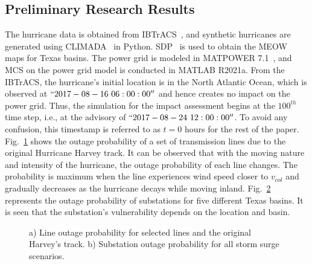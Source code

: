 \subsection{Preliminary Research Results}
The hurricane data is obtained from IBTrACS~\cite{Knapp2010}, and synthetic hurricanes are generated using CLIMADA~\cite{Climada} in Python. SDP~\cite{SDP} is used to obtain the MEOW maps for Texas basins. The power grid is modeled in MATPOWER 7.1~\cite{5491276}, and MCS on the power grid model is conducted in MATLAB R2021a.  
From the IBTrACS, the hurricane's initial location is in the North Atlantic Ocean, which is observed at $``2017-08-16~06:00:00''$ and hence creates no impact on the power grid. Thus, the simulation for the impact assessment begins at the $100^{th}$ time step, i.e., at the advisory of $``2017-08-24~12:00:00''$. To avoid any confusion, this timestamp is referred to as $t=0$ hours for the rest of the paper. Fig.~\ref{fig:line_outage_probability} shows the outage probability of a set of transmission lines due to the original Hurricane Harvey track. It can be observed that with the moving nature and intensity of the hurricane, the outage probability of each line changes. The probability is maximum when the line experiences wind speed closer to $v_{col}$ and gradually decreases as the hurricane decays while moving inland. Fig.~\ref{fig:substation_outage_probability} represents the outage probability of substations for five different Texas basins. It is seen that the substation's vulnerability depends on the location and basin.

\begin{figure}[!h!]
    \centering
    \begin{subfigure}[t]{0.47\textwidth}
        \centering
        \caption{}
        \label{fig:line_outage_probability}    
    \end{subfigure}
    \hspace*{\fill}
    \begin{subfigure}[t]{0.47\textwidth}
        \centering
        \caption{}
        \label{fig:substation_outage_probability}
    \end{subfigure}
    \caption{a) Line outage probability for selected lines and the original Harvey's track. b) Substation outage probability for all storm surge scenarios.} 
    \vspace{-10pt}
    \label{fig:hurricane_flood_outages}
\end{figure}

